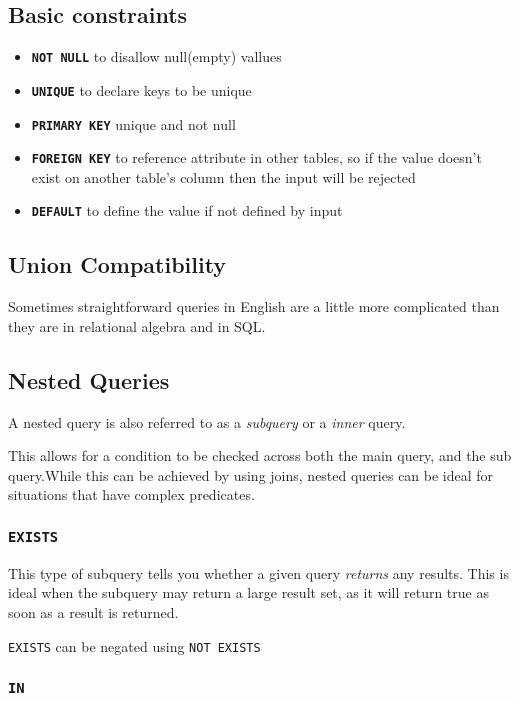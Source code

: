 \documentclass{article}
\begin{document}
\subsection{Basic constraints}
\begin{itemize}
  \item \texttt{\textbf{NOT NULL}} to disallow null(empty) vallues
  \item \texttt{\textbf{UNIQUE}} to declare keys to be unique
  \item \texttt{\textbf{PRIMARY KEY}} unique and not null
  \item \texttt{\textbf{FOREIGN KEY}} to reference attribute in other tables, so if the value doesn't exist on another table's column then the input will be rejected
  \item \texttt{\textbf{DEFAULT}} to define the value if not defined by input
\end{itemize}


\subsection{Union Compatibility}

Sometimes straightforward queries in English are a little more complicated than they are in relational algebra and in SQL.

\subsection{Nested Queries}

A nested query is also referred to as a \textit{subquery} or a \textit{inner} query.

This allows for a condition to be checked across both the main query, and the sub query.While this can be achieved by using joins, nested queries can be ideal for situations that have complex predicates.

\subsubsection*{\texttt{EXISTS}}

This type of subquery tells you whether a given query \textit{returns} any results. This is ideal when the subquery may return a large result set, as it will return true as soon as a result is returned.

\texttt{EXISTS} can be negated using \texttt{NOT EXISTS}

\subsubsection*{\texttt{IN}}
\end{document}
